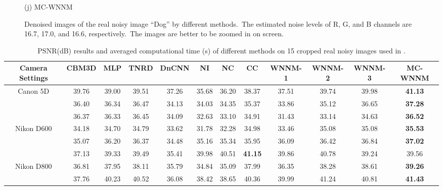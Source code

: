 \documentclass[10pt,twocolumn,letterpaper]{article}
\begin{document}
\begin{figure}[t]
{\begin{minipage}[t]{0.19\textwidth}
{\footnotesize (j) MC-WNNM  }
\end{minipage}
}
\vspace{-1mm}
\caption{Denoised images of the real noisy image ``Dog'' \cite{ncwebsite} by different methods.\ The estimated noise levels of R, G, and B channels are 16.7, 17.0, and 16.6, respectively.\ The images are better to be zoomed in on screen.}
\label{f3}
\vspace{-3mm}
\end{figure}

\begin{table}
\caption{PSNR(dB) results and averaged computational time (s) of different methods on 15 cropped real noisy images used in \cite{crosschannel2016}.}
\vspace{0.5mm}
\label{t2}
\label{tabb}
\begin{center}
\renewcommand\arraystretch{1}
\scriptsize
\begin{tabular}{|c||c|c|c|c|c|c|c|c|c|c|c|}
\hline
Camera Settings  
&
\textbf{CBM3D}
&
\textbf{MLP}
&
\textbf{TNRD}
&
\textbf{DnCNN}
&
\textbf{NI}
&
\textbf{NC}
&
\textbf{CC}
&
\textbf{WNNM-1}
&
\textbf{WNNM-2}
&
\textbf{WNNM-3}
&
\textbf{MC-WNNM} 
\\
\hline
\multirow{3}{*}{\small{Canon 5D}} %
& 39.76 & 39.00 & 39.51 & 37.26 & 35.68 & 36.20 & 38.37 & 37.51 & 39.74 & 39.98 & \textbf{41.13}
\\ 
\cline{2-12} 
\multirow{3}{*}{ISO = 3200}   
& 36.40 & 36.34 & 36.47 & 34.13 & 34.03 & 34.35 & 35.37 & 33.86 & 35.12 & 36.65 & \textbf{37.28}
\\ 
\cline{2-12}    
& 36.37 & 36.33 & 36.45 & 34.09 & 32.63 & 33.10 & 34.91 & 31.43 & 33.14 & 34.63 & \textbf{36.52}  
\\
\hline
\multirow{3}{*}{Nikon D600} 
& 34.18 & 34.70 & 34.79 & 33.62 & 31.78 & 32.28 & 34.98 & 33.46 & 35.08 & 35.08 & \textbf{35.53}
\\ 
\cline{2-12} 
\multirow{3}{*}{ISO = 3200}   
& 35.07 & 36.20 & 36.37 & 34.48 & 35.16 & 35.34 & 35.95 & 36.09 & 36.42 & 36.84 & \textbf{37.02}
\\ 
\cline{2-12}    
& 37.13 & 39.33 & 39.49 & 35.41 & 39.98 & 40.51 & \textbf{41.15} & 39.86 & 40.78 & 39.24 & 39.56
\\
\hline
\multirow{3}{*}{Nikon D800} 
& 36.81  & 37.95 & 38.11 & 35.79 & 34.84 & 35.09 & 37.99 & 36.35 & 38.28 & 38.61 & \textbf{39.26}
\\ 
\cline{2-12} 
\multirow{3}{*}{ISO = 1600}   
& 37.76 & 40.23 & 40.52 & 36.08 & 38.42 & 38.65 & 40.36 & 39.99 & 41.24 & 40.81 & \textbf{41.43}

\end{tabular}
\end{center}
\end{table}
\end{document}
